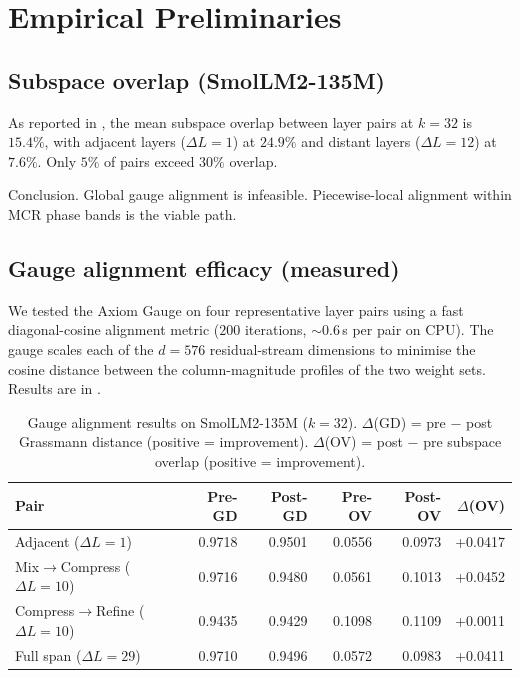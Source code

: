 \documentclass[11pt]{article}
\begin{document}
\section{Empirical Preliminaries}
\label{sec:empirical}

\subsection{Subspace overlap (SmolLM2-135M)}

As reported in , the mean subspace overlap
between layer pairs at $k{=}32$ is $15.4\%$, with adjacent layers
($\Delta L{=}1$) at $24.9\%$ and distant layers ($\Delta L{=}12$)
at $7.6\%$. Only $5\%$ of pairs exceed $30\%$ overlap.

Conclusion. Global gauge alignment is infeasible.
Piecewise-local alignment within MCR phase bands is the viable path.

\subsection{Gauge alignment efficacy (measured)}

We tested the Axiom Gauge on four representative layer pairs using
a fast diagonal-cosine alignment metric ($200$ iterations, ${\sim}0.6$\,s
per pair on CPU). The gauge scales each of the $d{=}576$ residual-stream
dimensions to minimise the cosine distance between the column-magnitude
profiles of the two weight sets. Results are in .

\begin{table}[h]\centering\small
\caption{Gauge alignment results on SmolLM2-135M ($k{=}32$).
$\Delta$(GD) = pre $-$ post Grassmann distance (positive = improvement).
$\Delta$(OV) = post $-$ pre subspace overlap (positive = improvement).}
\label{tab:gauge-align}
\begin{tabular}{@{}lrrrrr@{}}
\toprule
Pair & Pre-GD & Post-GD & Pre-OV & Post-OV & $\Delta$(OV) \\
\midrule
Adjacent ($\Delta L{=}1$) & 0.9718 & 0.9501 & 0.0556 & 0.0973 & +0.0417 \\
Mix$\to$Compress ($\Delta L{=}10$) & 0.9716 & 0.9480 & 0.0561 & 0.1013 & +0.0452 \\
Compress$\to$Refine ($\Delta L{=}10$) & 0.9435 & 0.9429 & 0.1098 & 0.1109 & +0.0011 \\
Full span ($\Delta L{=}29$) & 0.9710 & 0.9496 & 0.0572 & 0.0983 & +0.0411 \\
\bottomrule
\end{tabular}
\end{table}
\end{document}
